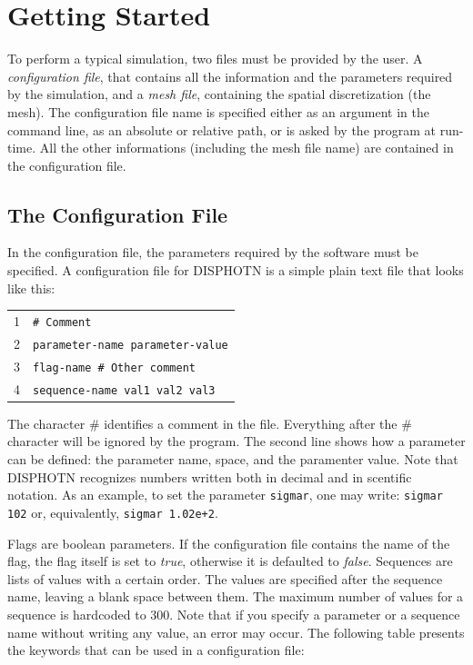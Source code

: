 \documentclass[11pt,a4paper,oneside]{article}
\begin{document}
\section{Getting Started}
To perform a typical simulation, two files must be provided by the user. A {\it configuration file}, that contains all the information and the parameters required by the simulation, and a {\it mesh file}, containing the spatial discretization (the mesh). The configuration file name is specified either as an argument in the command line, as an absolute or relative path, or is asked by the program at run-time. All the other informations (including the mesh file name) are contained in the configuration file.

\subsection{The Configuration File}
In the configuration file, the parameters required by the software must be specified. A configuration file for DISPHOTN is a simple plain text file that looks like this:
\begin{center}
  \begin{tabular}{| l | l |}
    \hline
   	1 & {\tt \# Comment}\\
	2 & {\tt parameter-name parameter-value}\\
	3 & {\tt flag-name	\qquad	 \# Other comment}\\	
	4 & {\tt sequence-name val1 val2 val3}\\
    \hline
  \end{tabular}
\end{center}

The character \# identifies a comment in the file. Everything after the \# character will be ignored by the program. The second line
shows how a parameter can be defined: the parameter name, space, and the paramenter value. Note that DISPHOTN recognizes numbers written both in decimal and in scentific notation. As an example, to set the parameter \texttt{sigmar}, one may write: \texttt{sigmar 102} or, equivalently, \texttt{sigmar 1.02e+2}.


Flags are boolean parameters. If the configuration file contains the name of the flag, the flag itself is set to \textit{true}, otherwise it is defaulted to \textit{false}. Sequences are lists of values with a certain order. The values are specified after the sequence name, leaving a blank space between them. The maximum number of values for a sequence is hardcoded to 300. Note that if you specify a parameter or a sequence name without writing any value, an error may occur. The following table presents the keywords that can be used in a configuration file:
\end{document}
